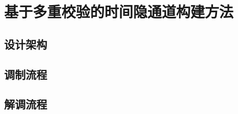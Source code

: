 \section{基于多重校验的时间隐通道构建方法}
\label{chap:hash:results}

\subsection{设计架构}
\label{chap:hash:results:model}

\subsection{调制流程}
\label{chap:hash:results:modulation}

\subsection{解调流程}
\label{chap:hash:results:demodulation}
